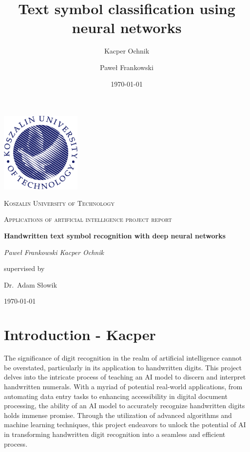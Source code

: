 \documentclass{article}
\title{Text symbol classification using neural networks}
\author{Kacper Ochnik \and Paweł Frankowski}
\date{\today}
\begin{document}
\begin{titlepage}
	\centering
	\includegraphics[width=0.3\textwidth]{Logo_PK_kolor_EN_PNG.png}\par\vspace{1cm}
	{\textsc{Koszalin University of Technology} \par}
	\vspace{1cm}
	{\Large \textsc{Applications of artificial intelligence project report}\par}
	\vspace{1.5cm}
	{\huge\bfseries Handwritten text symbol recognition with deep neural networks
	\par}
	\vspace{2cm}
	{\Large\itshape {Paweł Frankowski \space Kacper Ochnik}\par}
	\vfill
	supervised by\par
	Dr.~Adam Słowik

	\vfill

	{\large \today\par}
\end{titlepage}

\tableofcontents
\newpage

\section{Introduction - Kacper}
The significance of digit recognition in the realm of artificial intelligence cannot be overstated, particularly in its application to handwritten digits. This project delves into the intricate process of teaching an AI model to discern and interpret handwritten numerals. With a myriad of potential real-world applications, from automating data entry tasks to enhancing accessibility in digital document processing, the ability of an AI model to accurately recognize handwritten digits holds immense promise. Through the utilization of advanced algorithms and machine learning techniques, this project endeavors to unlock the potential of AI in transforming handwritten digit recognition into a seamless and efficient process.
\end{document}
